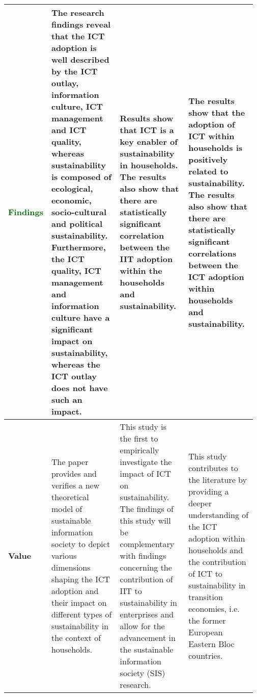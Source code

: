\documentclass[11pt,a4paper]{article}
\newcommand{\absp}{\textcolor{darkred}{Purpose}\xspace}
\newcommand{\absm}{\textcolor{darkblue}{Method}\xspace}
\newcommand{\absf}{\textcolor{darkgreen}{Findings}\xspace}
\newcommand{\absv}{\textcolor{darkyellow}{Value}\xspace}
\newcommand{\bart}{BART\xspace}
\newcommand{\bartf}{BART-Facet\xspace}
\begin{document}
\begin{table*}[!ht]
{\begin{tabular}{m{0.07\linewidth}  p{0.3\linewidth}  p{0.3\linewidth}  p{0.3\linewidth}}
        \\ \midrule
        \textbf{\absf} &
        The research findings reveal that the ICT adoption is well described by the ICT outlay, information culture, ICT management and ICT quality, whereas sustainability is composed of ecological, economic, socio-cultural and political sustainability. Furthermore, the ICT quality, ICT management and information culture have a significant impact on sustainability, whereas the ICT outlay does not have such an impact. &
        Results show that ICT is a key enabler of sustainability in households. The results also show that there are statistically significant correlation between the IIT adoption within the households and sustainability.

&        
The results show that the adoption of ICT within households is positively related to sustainability. The results also show that there are statistically significant correlations between the ICT adoption within households and sustainability.

 \\ \midrule
         
 \textbf{\absv} & 
 The paper provides and verifies a new theoretical model of sustainable information society to depict various dimensions shaping the ICT adoption and their impact on different types of sustainability in the context of households. &
 This study is the first to empirically investigate the impact of ICT on sustainability. The findings of this study will be complementary with findings concerning the contribution of IIT to sustainability in enterprises and allow for the advancement in the sustainable information society (SIS) research.
&
 This study contributes to the literature by providing a deeper understanding of the ICT adoption within households and the contribution of ICT to sustainability in transition economies, i.e. the former European Eastern Bloc countries.
\\
        \bottomrule
    \end{tabular}}
    \caption{Outputs by \textbf{\bart} and \textbf{\bartf} on different facets. Both models are able to generate reasonable summaries given the specified facet. \bartf provides more information of \absm and less errors than \bart (e.g. ``IIT'' is a typo of ``ICT''). However both models tend to directly copy text from the source, for example both outputs of \absp can be found in the introduction of the paper.}
    \label{table:example_generation}
\end{table*}
\end{document}
